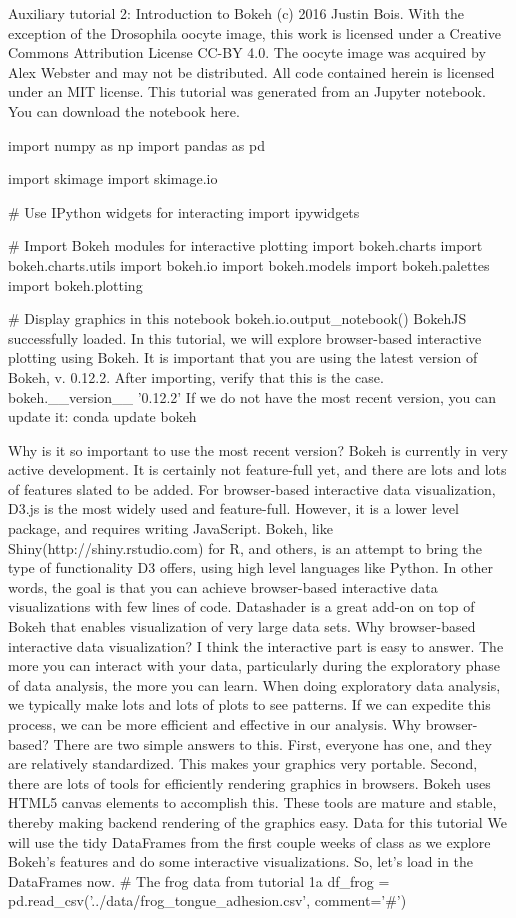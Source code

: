 
Auxiliary tutorial 2: Introduction to Bokeh
(c) 2016 Justin Bois. With the exception of the Drosophila oocyte image, this work is licensed under a Creative Commons Attribution License CC-BY 4.0. The oocyte image was acquired by Alex Webster and may not be distributed. All code contained herein is licensed under an MIT license.
This tutorial was generated from an Jupyter notebook. You can download the notebook here.

import numpy as np
import pandas as pd

import skimage
import skimage.io

# Use IPython widgets for interacting
import ipywidgets

# Import Bokeh modules for interactive plotting
import bokeh.charts
import bokeh.charts.utils
import bokeh.io
import bokeh.models
import bokeh.palettes
import bokeh.plotting

# Display graphics in this notebook
bokeh.io.output_notebook()
 BokehJS successfully loaded.
In this tutorial, we will explore browser-based interactive plotting using Bokeh. It is important that you are using the latest version of Bokeh, v. 0.12.2. After importing, verify that this is the case.
bokeh.__version__
'0.12.2'
If we do not have the most recent version, you can update it:
conda update bokeh


Why is it so important to use the most recent version? Bokeh is currently in very active development. It is certainly not feature-full yet, and there are lots and lots of features slated to be added.
For browser-based interactive data visualization, D3.js is the most widely used and feature-full. However, it is a lower level package, and requires writing JavaScript. Bokeh, like Shiny(http://shiny.rstudio.com) for R, and others, is an attempt to bring the type of functionality D3 offers, using high level languages like Python. In other words, the goal is that you can achieve browser-based interactive data visualizations with few lines of code.
Datashader is a great add-on on top of Bokeh that enables visualization of very large data sets.
Why browser-based interactive data visualization?
I think the interactive part is easy to answer. The more you can interact with your data, particularly during the exploratory phase of data analysis, the more you can learn. When doing exploratory data analysis, we typically make lots and lots of plots to see patterns. If we can expedite this process, we can be more efficient and effective in our analysis.
Why browser-based? There are two simple answers to this. First, everyone has one, and they are relatively standardized. This makes your graphics very portable. Second, there are lots of tools for efficiently rendering graphics in browsers. Bokeh uses HTML5 canvas elements to accomplish this. These tools are mature and stable, thereby making backend rendering of the graphics easy.
Data for this tutorial
We will use the tidy DataFrames from the first couple weeks of class as we explore Bokeh's features and do some interactive visualizations. So, let's load in the DataFrames now.
# The frog data from tutorial 1a
df_frog = pd.read_csv('../data/frog_tongue_adhesion.csv', comment='#')

